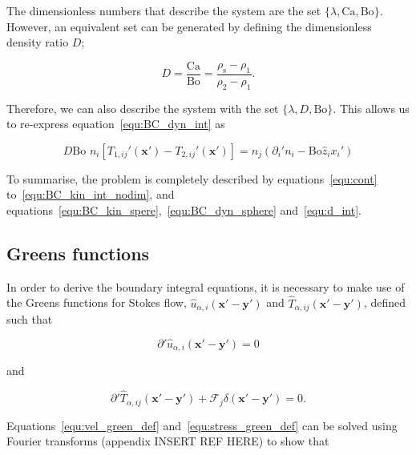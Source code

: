 \documentclass[12pt]{article}
\begin{document}
The dimensionless numbers that describe the system are the set $\{\lambda, \text{Ca}, \text{Bo}\}$. However, an equivalent set can be generated by defining the dimensionless density ratio $D$;

\begin{equation}
\label{equ:dim_dens_rat}
D = \frac{\text{Ca}}{\text{Bo}} = \frac{\rho_{\text{s}} - \rho_{1}}{\rho_{2} - \rho_{1}}.
\end{equation}

Therefore, we can also describe the system with the set $\{\lambda, D, \text{Bo}\}$. This allows us to re-express equation~\ref{equ:BC_dyn_int} as

\begin{equation}
\label{equ:d_int}
D \text{Bo } n_{i} [T_{1, ij}'(\boldsymbol{x'}) - T_{2, ij}'(\boldsymbol{x'})] = n_{j}(\partial_{i}' n_{i} - \text{Bo} \hat{z}_{i} x_{i}')
\end{equation}

To summarise, the problem is completely described by equations~\ref{equ:cont} to~\ref{equ:BC_kin_int_nodim}, and equations~\ref{equ:BC_kin_spere},~\ref{equ:BC_dyn_sphere} and~\ref{equ:d_int}.


\subsection{Greens functions}
\label{subsec:BIE_deriv}

In order to derive the boundary integral equations, it is necessary to make use of the Greens functions for Stokes flow, $\hat{u}_{\alpha,i}(\boldsymbol{x'} - \boldsymbol{y'})$ and $\hat{T}_{\alpha,ij}(\boldsymbol{x'} - \boldsymbol{y'})$, defined such that

\begin{equation}
\label{equ:vel_green_def}
\partial' \hat{u}_{\alpha,i}(\boldsymbol{x'} - \boldsymbol{y'}) = 0 
\end{equation}

and

\begin{equation}
\label{equ:stress_green_def}
\partial' \hat{T}_{\alpha,ij}(\boldsymbol{x'} - \boldsymbol{y'}) + \mathcal{F}_{j} \delta(\boldsymbol{x'} - \boldsymbol{y'}) = 0 .
\end{equation}

Equations~\ref{equ:vel_green_def} and~\ref{equ:stress_green_def} can be solved using Fourier transforms (appendix INSERT REF HERE) to show that





\end{document}
